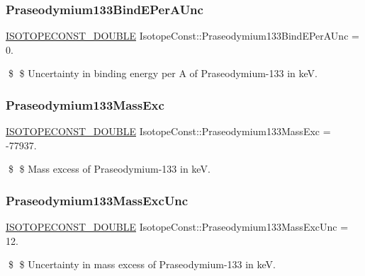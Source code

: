 \subsubsection{\texorpdfstring{Praseodymium133\+Bind\+E\+Per\+A\+Unc}{Praseodymium133BindEPerAUnc}}
{\footnotesize\ttfamily \mbox{\hyperlink{group___isotope_const-_macros_ga8f45a7272ce02c0b4c65c44636ed719a}{I\+S\+O\+T\+O\+P\+E\+C\+O\+N\+S\+T\+\_\+\+D\+O\+U\+B\+LE}} Isotope\+Const\+::\+Praseodymium133\+Bind\+E\+Per\+A\+Unc = 0.}

\$ \$ Uncertainty in binding energy per A of Praseodymium-\/133 in keV. \mbox{\label{group___isotope_const-_praseodymium-_pr133_gaf2383e342598ada60058fa1045bdb982}} 
\subsubsection{\texorpdfstring{Praseodymium133\+Mass\+Exc}{Praseodymium133MassExc}}
{\footnotesize\ttfamily \mbox{\hyperlink{group___isotope_const-_macros_ga8f45a7272ce02c0b4c65c44636ed719a}{I\+S\+O\+T\+O\+P\+E\+C\+O\+N\+S\+T\+\_\+\+D\+O\+U\+B\+LE}} Isotope\+Const\+::\+Praseodymium133\+Mass\+Exc = -\/77937.}

\$ \$ Mass excess of Praseodymium-\/133 in keV. \mbox{\label{group___isotope_const-_praseodymium-_pr133_ga2a6bebbc076e66f1c41122835bb8dd7c}} 
\subsubsection{\texorpdfstring{Praseodymium133\+Mass\+Exc\+Unc}{Praseodymium133MassExcUnc}}
{\footnotesize\ttfamily \mbox{\hyperlink{group___isotope_const-_macros_ga8f45a7272ce02c0b4c65c44636ed719a}{I\+S\+O\+T\+O\+P\+E\+C\+O\+N\+S\+T\+\_\+\+D\+O\+U\+B\+LE}} Isotope\+Const\+::\+Praseodymium133\+Mass\+Exc\+Unc = 12.}

\$ \$ Uncertainty in mass excess of Praseodymium-\/133 in keV. \mbox{\label{group___isotope_const-_praseodymium-_pr133_gab3a1bc01a25465c7e8fcb1915b193b12}} 
